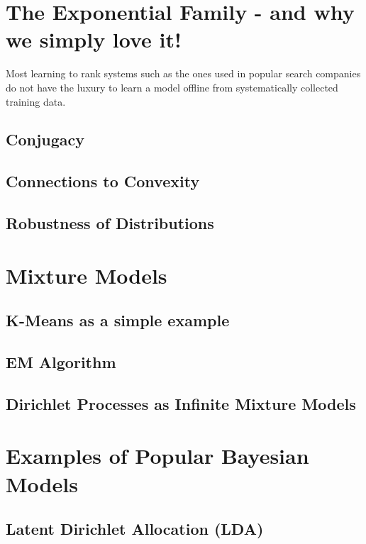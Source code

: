 \documentclass[a4paper]{article}
\begin{document}
\section{The Exponential Family - and why we simply love it!}
\noindent Most learning to rank systems such as the ones used in popular search companies do not have the luxury to learn a model offline from systematically collected training data.



\subsection{Conjugacy}

\subsection{Connections to Convexity}

\subsection{Robustness of Distributions}

\section{Mixture Models}
\subsection{K-Means as a simple example}
\subsection{EM Algorithm}
\subsection{Dirichlet Processes as Infinite Mixture Models}

\section{Examples of Popular Bayesian Models}
\subsection{Latent Dirichlet Allocation (LDA)}
 


\end{document}

